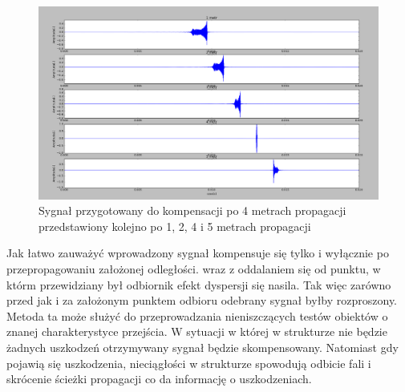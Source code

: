 \begin{figure}[h]
\centering
\includegraphics[width=14cm]{Zdjecia/4/porownanie_roznych_odleglosci_time_reversal}
\caption{Sygnał przygotowany do kompensacji po 4 metrach propagacji przedstawiony kolejno po 1, 2, 4 i 5 metrach propagacji}
\label{fig:rozne_odl}
\end{figure}

Jak łatwo zauważyć wprowadzony sygnał kompensuje się tylko i wyłącznie po przepropagowaniu założonej odległości. wraz z oddalaniem się od punktu, w którm przewidziany był odbiornik efekt dyspersji się nasila. Tak więc zarówno przed jak i za założonym punktem odbioru odebrany sygnał byłby rozproszony. Metoda ta może służyć do przeprowadzania nieniszczących testów obiektów o znanej charakterystyce przejścia. W sytuacji w której w strukturze nie będzie żadnych uszkodzeń otrzymywany sygnał będzie skompensowany. Natomiast gdy pojawią się uszkodzenia, nieciągłości w strukturze spowodują odbicie fali i skrócenie ścieżki propagacji co da informację o uszkodzeniach. 

